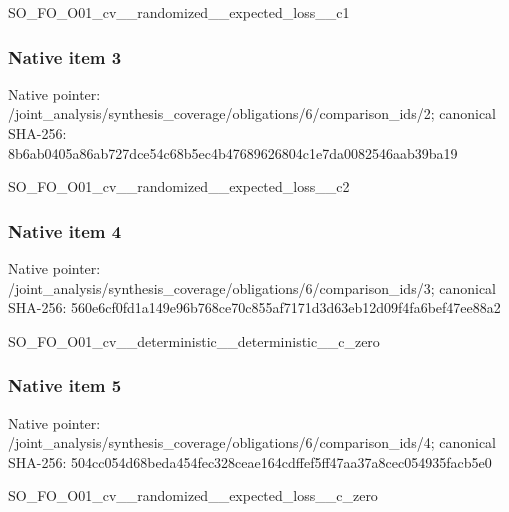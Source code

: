 \documentclass[10pt,a4paper]{article}
\begin{document}
\begingroup\raggedright\sloppy SO\_\allowbreak{}FO\_\allowbreak{}O01\_\allowbreak{}cv\_\allowbreak{}\_\allowbreak{}randomized\_\allowbreak{}\_\allowbreak{}expected\_\allowbreak{}loss\_\allowbreak{}\_\allowbreak{}c1\par\endgroup

\subsubsection{Native item 3}
Native pointer: /joint\_\allowbreak{}analysis/synthesis\_\allowbreak{}coverage/obligations/6/comparison\_\allowbreak{}ids/2; canonical SHA-256: 8b6ab0405a86ab727dce54c68b5ec4b47689626804c1e7da0082546aab39ba19

\begingroup\raggedright\sloppy SO\_\allowbreak{}FO\_\allowbreak{}O01\_\allowbreak{}cv\_\allowbreak{}\_\allowbreak{}randomized\_\allowbreak{}\_\allowbreak{}expected\_\allowbreak{}loss\_\allowbreak{}\_\allowbreak{}c2\par\endgroup

\subsubsection{Native item 4}
Native pointer: /joint\_\allowbreak{}analysis/synthesis\_\allowbreak{}coverage/obligations/6/comparison\_\allowbreak{}ids/3; canonical SHA-256: 560e6cf0fd1a149e96b768ce70c855af7171d3d63eb12d09f4fa6bef47ee88a2

\begingroup\raggedright\sloppy SO\_\allowbreak{}FO\_\allowbreak{}O01\_\allowbreak{}cv\_\allowbreak{}\_\allowbreak{}deterministic\_\allowbreak{}\_\allowbreak{}deterministic\_\allowbreak{}\_\allowbreak{}c\_\allowbreak{}zero\par\endgroup

\subsubsection{Native item 5}
Native pointer: /joint\_\allowbreak{}analysis/synthesis\_\allowbreak{}coverage/obligations/6/comparison\_\allowbreak{}ids/4; canonical SHA-256: 504cc054d68beda454fec328ceae164cdffef5ff47aa37a8cec054935facb5e0

\begingroup\raggedright\sloppy SO\_\allowbreak{}FO\_\allowbreak{}O01\_\allowbreak{}cv\_\allowbreak{}\_\allowbreak{}randomized\_\allowbreak{}\_\allowbreak{}expected\_\allowbreak{}loss\_\allowbreak{}\_\allowbreak{}c\_\allowbreak{}zero\par\endgroup
\end{document}
